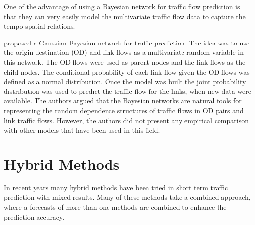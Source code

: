 One of the advantage of using a Bayesian network for traffic flow prediction is that they can
very easily model the multivariate traffic flow data to capture the tempo-spatial relations.

\citet{castillo2008predicting} proposed a Gaussian Bayesian network for traffic prediction. The idea
was to use the origin-destination (OD) and link flows as a multivariate random variable in this network.
The OD flows were used as parent nodes and the link flows as the child nodes. The conditional
probability of each link flow given the OD flows was defined as a normal distribution. Once the model
was built the joint probability distribution was used to predict the traffic flow for the links, when
new data were available. The authors argued that the Bayesian networks are natural tools for representing
the random dependence structures of traffic flows in OD pairs and link traffic flows. However, the authors did not
present any empirical comparison with other models that have been used in this field.


\section{Hybrid Methods}
In recent years many hybrid methods have been tried in short term traffic prediction with mixed
results. Many of these methods take a combined approach, where a forecasts of more than one methods
are combined to enhance the prediction accuracy.

